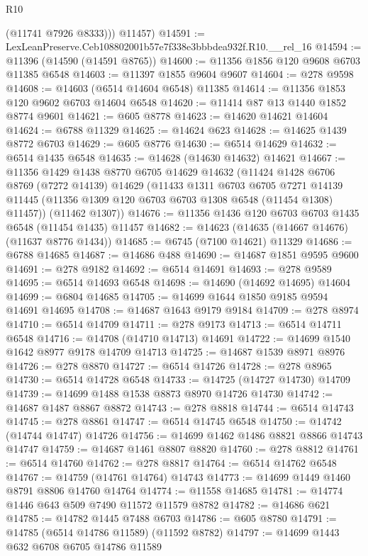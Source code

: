\begin{lexlean}{R10}
\begin{coremodule}
          (@11741 @7926 @8333)))
      @11457)
@14591 := LexLeanPreserve.Ceb108802001b57e7f338e3bbbdea932f.R10.__rel_16
@14594 := @11396 (@14590 (@14591 @8765))
@14600 := @11356 @1856 @120 @9608 @6703 @11385 @6548
@14603 := @11397 @1855 @9604 @9607
@14604 := @278 @9598
@14608 := @14603 (@6514 @14604 @6548) @11385
@14614 := @11356 @1853 @120 @9602 @6703 @14604 @6548
@14620 := @11414 @87 @13 @1440 @1852 @8774 @9601
@14621 := @605 @8778
@14623 := @14620 @14621 @14604
@14624 := @6788 @11329
@14625 := @14624 @623
@14628 := @14625 @1439 @8772 @6703
@14629 := @605 @8776
@14630 := @6514 @14629
@14632 := @6514 @1435 @6548
@14635 := @14628 (@14630 @14632) @14621
@14667 := @11356
    @1429
    @1438
    @8770
    @6705
    @14629
    @14632
    (@11424
      @1428
      @6706
      @8769
      (@7272 @14139)
      @14629
      (@11433
        @1311
        @6703
        @6705
        @7271
        @14139
        @11445
        (@11356 @1309 @120 @6703 @6703 @1308 @6548 (@11454 @1308) @11457))
      (@11462 @1307))
@14676 := @11356 @1436 @120 @6703 @6703 @1435 @6548 (@11454 @1435) @11457
@14682 := @14623 (@14635 (@14667 @14676) (@11637 @8776 @1434))
@14685 := @6745 (@7100 @14621) @11329
@14686 := @6788 @14685
@14687 := @14686 @488
@14690 := @14687 @1851 @9595 @9600
@14691 := @278 @9182
@14692 := @6514 @14691
@14693 := @278 @9589
@14695 := @6514 @14693 @6548
@14698 := @14690 (@14692 @14695) @14604
@14699 := @6804 @14685
@14705 := @14699 @1644 @1850 @9185 @9594 @14691 @14695
@14708 := @14687 @1643 @9179 @9184
@14709 := @278 @8974
@14710 := @6514 @14709
@14711 := @278 @9173
@14713 := @6514 @14711 @6548
@14716 := @14708 (@14710 @14713) @14691
@14722 := @14699 @1540 @1642 @8977 @9178 @14709 @14713
@14725 := @14687 @1539 @8971 @8976
@14726 := @278 @8870
@14727 := @6514 @14726
@14728 := @278 @8965
@14730 := @6514 @14728 @6548
@14733 := @14725 (@14727 @14730) @14709
@14739 := @14699 @1488 @1538 @8873 @8970 @14726 @14730
@14742 := @14687 @1487 @8867 @8872
@14743 := @278 @8818
@14744 := @6514 @14743
@14745 := @278 @8861
@14747 := @6514 @14745 @6548
@14750 := @14742 (@14744 @14747) @14726
@14756 := @14699 @1462 @1486 @8821 @8866 @14743 @14747
@14759 := @14687 @1461 @8807 @8820
@14760 := @278 @8812
@14761 := @6514 @14760
@14762 := @278 @8817
@14764 := @6514 @14762 @6548
@14767 := @14759 (@14761 @14764) @14743
@14773 := @14699 @1449 @1460 @8791 @8806 @14760 @14764
@14774 := @11558 @14685
@14781 := @14774 @1446 @643 @509 @7490 @11572 @11579 @8782
@14782 := @14686 @621
@14785 := @14782 @1445 @7488 @6703
@14786 := @605 @8780
@14791 := @14785 (@6514 @14786 @11589) (@11592 @8782)
@14797 := @14699 @1443 @632 @6708 @6705 @14786 @11589

\end{coremodule}
\end{lexlean}
